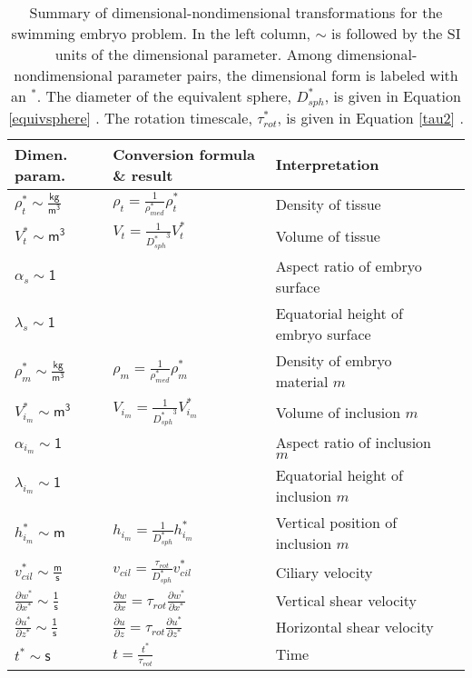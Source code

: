 \documentclass[10pt,a4paper]{article}
\def\p{\partial}
\begin{document}
\begin{table}[h]
	\centering
	\caption{Summary of dimensional-nondimensional transformations for the swimming embryo problem. In the left column, $\sim$ is followed by the SI units of the dimensional parameter. Among dimensional-nondimensional parameter pairs, the dimensional form is labeled with an $^*$. The diameter of the equivalent sphere, $D_{sph}^*$, is given in Equation \ref{equivsphere} . The rotation timescale, $\tau^*_{rot}$, is given in Equation \ref{tau2} .} \label{tab:d2nd}
	\vspace{.25cm}
	\small
	\begin{tabular}{|I|L|lL|}
		\hline
		Dimen. param. & Conversion formula \& result & \hspace{1cm} Interpretation \\
		\hline
		$\rho_t^* \sim \mathsf{\frac{kg}{m^3}}$ & $\rho_t = \frac{1}{\rho_{med}^*} \rho_t^* $  & Density of tissue \\
		$V^*_t \sim \mathsf{m^3}$ & $V_t = \frac{1}{{D_{sph}^*}^3} V^*_t $  & Volume of tissue \\
		$\alpha_s \sim \mathsf{1}$ &    & Aspect ratio of embryo surface \\
		$\lambda_s \sim \mathsf{1}$ &    & Equatorial height of embryo surface \\
		$\rho_m^* \sim \mathsf{\frac{kg}{m^3}}$ & $\rho_m = \frac{1}{\rho_{med}^*} \rho_m^* $  & Density of embryo material $m$ \\
		$V^*_{i_m} \sim \mathsf{m^3}$ & $V_{i_m} = \frac{1}{{D_{sph}^*}^3} V^*_{i_m} $  & Volume of inclusion $m$ \\
		$\alpha_{i_m} \sim \mathsf{1}$ &    & Aspect ratio of inclusion $m$ \\
		$\lambda_{i_m} \sim \mathsf{1}$ &    & Equatorial height of inclusion $m$ \\
		$h^*_{i_m} \sim \mathsf{m}$ & $h_{i_m} = \frac{1}{{D_{sph}^*}} h^*_{i_m} $  & Vertical position of inclusion $m$ \\
		$v^*_{cil} \sim \mathsf{\frac{m}{s}}$ & $v_{cil} = \frac{{\tau_{rot}}}{D_{sph}^*}  v^*_{cil}  $  & Ciliary velocity \\
		\hline
		\vspace{0.1cm}
		$\frac{\p w^*}{\p x^*} \sim \mathsf{\frac{1}{s}}$ & $\frac{\p w}{\p x} = \tau_{rot} \frac{\p w^*}{\p x^*}  $  & Vertical shear velocity \\
		\vspace{0.1cm}
		$\frac{\p u^*}{\p z^*} \sim \mathsf{\frac{1}{s}}$ & $\frac{\p u}{\p z} = \tau_{rot} \frac{\p u^*}{\p z^*}  $  & Horizontal shear velocity \\
		\vspace{0.1cm}
		$t^* \sim \mathsf{s}$ & $t =  \frac{t^*}{\tau_{rot}}  $  & Time \\
		\hline
	\end{tabular}
\end{table}
\end{document}
